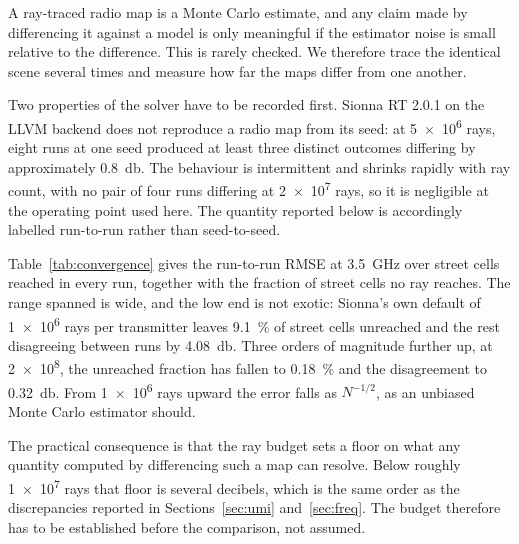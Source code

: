 \documentclass[conference]{IEEEtran}
\begin{document}
A ray-traced radio map is a Monte Carlo estimate, and any claim made by
differencing it against a model is only meaningful if the estimator noise is
small relative to the difference. This is rarely checked. We therefore trace
the identical scene several times and measure how far the maps differ from one
another.

Two properties of the solver have to be recorded first. Sionna RT 2.0.1 on the
LLVM backend does not reproduce a radio map from its seed: at \num{5e6} rays,
eight runs at one seed produced at least three distinct outcomes differing by
approximately \SI{0.8}{\decibel}. The behaviour is intermittent and shrinks
rapidly with ray count, with no pair of four runs differing at \num{2e7} rays,
so it is negligible at the operating point used here. The quantity reported
below is accordingly labelled run-to-run rather than seed-to-seed.

Table~\ref{tab:convergence} gives the run-to-run RMSE at \SI{3.5}{\giga\hertz}
over street cells reached in every run, together with the fraction of street
cells no ray reaches. The range spanned is wide, and the low end is not
exotic: Sionna's own default of \num{1e6} rays per transmitter leaves
\SI{9.1}{\percent} of street cells unreached and the rest disagreeing between
runs by \SI{4.08}{\decibel}. Three orders of magnitude further up, at
\num{2e8}, the unreached fraction has fallen to \SI{0.18}{\percent} and the
disagreement to \SI{0.32}{\decibel}. From \num{1e6} rays upward the error falls
as $N^{-1/2}$, as an unbiased Monte Carlo estimator should.

The practical consequence is that the ray budget sets a floor on what any
quantity computed by differencing such a map can resolve. Below roughly
\num{1e7} rays that floor is several decibels, which is the same order as the
discrepancies reported in Sections~\ref{sec:umi} and~\ref{sec:freq}. The budget
therefore has to be established before the comparison, not assumed.
\end{document}
